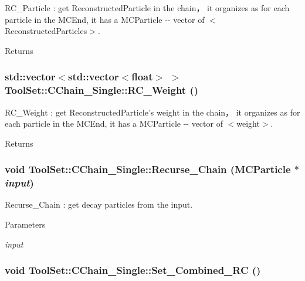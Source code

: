 RC\_\-Particle : get ReconstructedParticle in the chain， it organizes as for each particle in the MCEnd, it has a MCParticle -\/-\/ vector of $<$ReconstructedParticles$>$. \begin{DoxyReturn}{Returns}

\end{DoxyReturn}
\hypertarget{classToolSet_1_1CChain__Single_ae1e9f5156d4f65888c0262284518601c}{
\subsubsection[{RC\_\-Weight}]{\setlength{\rightskip}{0pt plus 5cm}std::vector$<$std::vector$<$float$>$ $>$ ToolSet::CChain\_\-Single::RC\_\-Weight ()}}
\label{classToolSet_1_1CChain__Single_ae1e9f5156d4f65888c0262284518601c}


RC\_\-Weight : get ReconstructedParticle's weight in the chain， it organizes as for each particle in the MCEnd, it has a MCParticle -\/-\/ vector of $<$weight$>$. \begin{DoxyReturn}{Returns}

\end{DoxyReturn}
\hypertarget{classToolSet_1_1CChain__Single_a6e24f84cd12c38d28f4e154f547d4170}{
\subsubsection[{Recurse\_\-Chain}]{\setlength{\rightskip}{0pt plus 5cm}void ToolSet::CChain\_\-Single::Recurse\_\-Chain (MCParticle $\ast$ {\em input})}}
\label{classToolSet_1_1CChain__Single_a6e24f84cd12c38d28f4e154f547d4170}


Recurse\_\-Chain : get decay particles from the input. 
\begin{DoxyParams}{Parameters}
\item[{\em input}]\end{DoxyParams}
\hypertarget{classToolSet_1_1CChain__Single_a7474584ac9cbcaf32f0b046bd733756d}{
\subsubsection[{Set\_\-Combined\_\-RC}]{\setlength{\rightskip}{0pt plus 5cm}void ToolSet::CChain\_\-Single::Set\_\-Combined\_\-RC ()}}
\label{classToolSet_1_1CChain__Single_a7474584ac9cbcaf32f0b046bd733756d}


